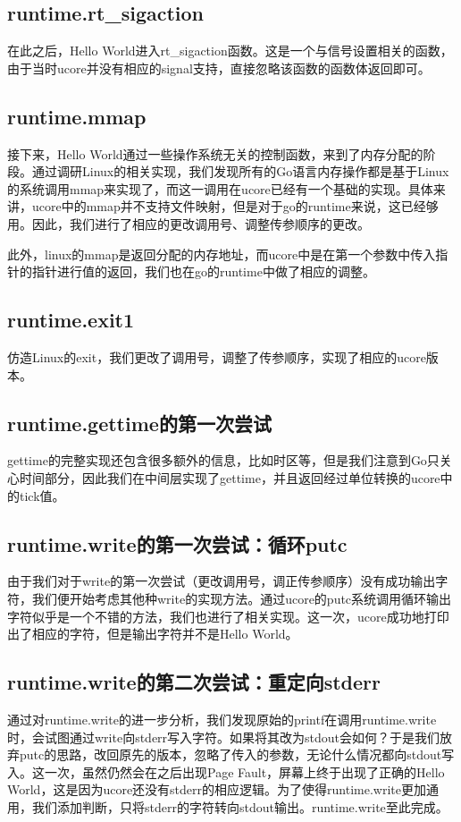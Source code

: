 \documentclass{article}
\begin{document}
\subsection{runtime.rt\_sigaction}
在此之后，Hello World进入rt\_sigaction函数。这是一个与信号设置相关的函数，由于当时ucore并没有相应的signal支持，直接忽略该函数的函数体返回即可。

\subsection{runtime.mmap}
接下来，Hello World通过一些操作系统无关的控制函数，来到了内存分配的阶段。通过调研Linux的相关实现，我们发现所有的Go语言内存操作都是基于Linux的系统调用mmap来实现了，而这一调用在ucore已经有一个基础的实现。具体来讲，ucore中的mmap并不支持文件映射，但是对于go的runtime来说，这已经够用。因此，我们进行了相应的更改调用号、调整传参顺序的更改。

此外，linux的mmap是返回分配的内存地址，而ucore中是在第一个参数中传入指针的指针进行值的返回，我们也在go的runtime中做了相应的调整。

\subsection{runtime.exit1}
仿造Linux的exit，我们更改了调用号，调整了传参顺序，实现了相应的ucore版本。

\subsection{runtime.gettime的第一次尝试}
gettime的完整实现还包含很多额外的信息，比如时区等，但是我们注意到Go只关心时间部分，因此我们在中间层实现了gettime，并且返回经过单位转换的ucore中的tick值。

\subsection{runtime.write的第一次尝试：循环putc}
由于我们对于write的第一次尝试（更改调用号，调正传参顺序）没有成功输出字符，我们便开始考虑其他种write的实现方法。通过ucore的putc系统调用循环输出字符似乎是一个不错的方法，我们也进行了相关实现。这一次，ucore成功地打印出了相应的字符，但是输出字符并不是Hello World。

\subsection{runtime.write的第二次尝试：重定向stderr}
通过对runtime.write的进一步分析，我们发现原始的printf在调用runtime.write时，会试图通过write向stderr写入字符。如果将其改为stdout会如何？于是我们放弃putc的思路，改回原先的版本，忽略了传入的参数，无论什么情况都向stdout写入。这一次，虽然仍然会在之后出现Page Fault，屏幕上终于出现了正确的Hello World，这是因为ucore还没有stderr的相应逻辑。为了使得runtime.write更加通用，我们添加判断，只将stderr的字符转向stdout输出。runtime.write至此完成。
\end{document}

